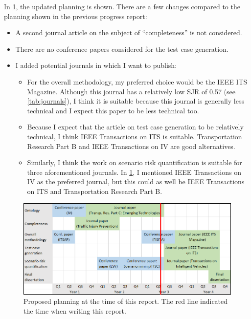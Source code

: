 \documentclass[10pt,final,a4paper,oneside,onecolumn]{article}
\begin{document}
In \cref{fig:planning}, the updated planning is shown. There are a few changes compared to the planning shown in the previous progress report:
\begin{itemize}
	\item A second journal article on the subject of ``completeness'' is not considered.
	\item There are no conference papers considered for the test case generation.
	\item I added potential journals in which I want to publish:
	\begin{itemize}
		\item For the overall methodology, my preferred choice would be the IEEE ITS Magazine. Although this journal has a relatively low SJR of 0.57 (see \cref{tab:journals}), I think it is suitable because this journal is generally less technical and I expect this paper to be less technical too.
		\item Because I expect that the article on test case generation to be relatively technical, I think IEEE Transactions on ITS is suitable. Transportation Research Part B and IEEE Transactions on IV are good alternatives.
		\item Similarly, I think the work on scenario risk quantification is suitable for three aforementioned journals. In \cref{fig:planning}, I mentioned IEEE Transactions on IV as the preferred journal, but this could as well be IEEE Transactions on ITS and Transportation Research Part B.
	\end{itemize}
\end{itemize}

\begin{figure}[t]
	\centering
	\includegraphics[width=\linewidth]{planning.png}
	\caption{Proposed planning at the time of this report. The red line indicated the time when writing this report.}
	\label{fig:planning}
\end{figure}
\end{document}
